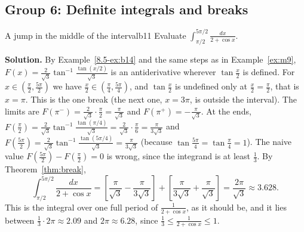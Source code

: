 \documentclass[11pt]{article}
\begin{document}
\subsection*{Group 6: Definite integrals and breaks}

\begin{exmp}{A jump in the middle of the interval}{b11}
Evaluate $\displaystyle\int_{\pi/2}^{5\pi/2}\frac{dx}{2+\cos x}$.

\textbf{Solution.} By Example~\ref{8.5-ex:b14} and the same steps as in Example~\ref{ex:m9}, $F(x)=\frac2{\sqrt3}\tan^{-1}\frac{\tan(x/2)}{\sqrt3}$ is an antiderivative wherever $\tan\frac x2$ is defined. For $x\in\left(\frac\pi2,\frac{5\pi}2\right)$ we have $\frac x2\in\left(\frac\pi4,\frac{5\pi}4\right)$, and $\tan\frac x2$ is undefined only at $\frac x2=\frac\pi2$, that is $x=\pi$. This is the one break (the next one, $x=3\pi$, is outside the interval). The limits are $F(\pi^-)=\frac2{\sqrt3}\cdot\frac\pi2=\frac\pi{\sqrt3}$ and $F(\pi^+)=-\frac\pi{\sqrt3}$. At the ends, $F\left(\frac\pi2\right)=\frac2{\sqrt3}\tan^{-1}\frac{\tan(\pi/4)}{\sqrt3}=\frac2{\sqrt3}\cdot\frac\pi6=\frac\pi{3\sqrt3}$ and $F\left(\frac{5\pi}2\right)=\frac2{\sqrt3}\tan^{-1}\frac{\tan(5\pi/4)}{\sqrt3}=\frac\pi{3\sqrt3}$ (because $\tan\frac{5\pi}4=\tan\frac\pi4=1$). The naive value $F\left(\frac{5\pi}2\right)-F\left(\frac\pi2\right)=0$ is wrong, since the integrand is at least $\frac13$. By Theorem~\ref{thm:break},
\[\int_{\pi/2}^{5\pi/2}\frac{dx}{2+\cos x}=\left[\frac\pi{\sqrt3}-\frac\pi{3\sqrt3}\right]+\left[\frac\pi{3\sqrt3}+\frac\pi{\sqrt3}\right]=\frac{2\pi}{\sqrt3}\approx3.628 .\]
This is the integral over one full period of $\frac1{2+\cos x}$, as it should be, and it lies between $\frac13\cdot2\pi\approx2.09$ and $2\pi\approx6.28$, since $\frac13\le\frac1{2+\cos x}\le1$.
\end{exmp}
\end{document}
